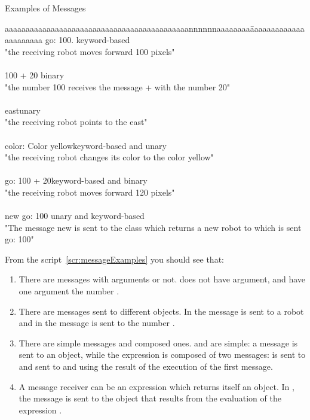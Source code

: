 \begin{scriptwithtitle}{Examples of Messages}\label{scr:messageExamples}
\begin{tabbing}
aaaaaaaaaaaaaaaaaaaaaaaaaaaaaaaaaaaaaaaaaaaannnnnnaaaaaaaa\=aaaaaaaaaaaaaaaaaaaaaa\kill
\caro go: 100.							\> keyword-based\\
"the receiving robot moves forward 100 pixels"\\
\\
100 + 20      						\>binary\\
"the number 100 receives the message + with the number 20"\\
\\
\caro east\>unary\\
"the receiving robot points to the east"\\
\\
\caro color: Color yellow\>keyword-based and unary\\
"the receiving robot changes its color to the color yellow"\\
\\
\caro go: 100 + 20\>keyword-based and binary\\
"the receiving robot moves forward 120 pixels"\\
\\
\Turtle new go: 100\> unary and keyword-based\\
"The message new is sent to the \Turtle class which 
returns a new robot to which is sent go: 100"
\end{tabbing}
\end{scriptwithtitle}


From the script~\ref{scr:messageExamples} you should see that: 
\begin{enumerate}
\item There are messages with arguments or not.  does not have argument,  and  have one argument the number . 
\item There are messages sent to different objects. In   the message is sent to a robot and in  the message is sent to the number .
\item There are simple messages and composed ones.  and  are  simple:  a message is sent to an object, while the expression  is composed of two messages:  is sent to  and  sent to \caro and using the result of the execution of the first message.
\item A message receiver can be an expression which returns itself an object. In , the message  is sent to the object that results from the evaluation of the expression .
\end{enumerate}


